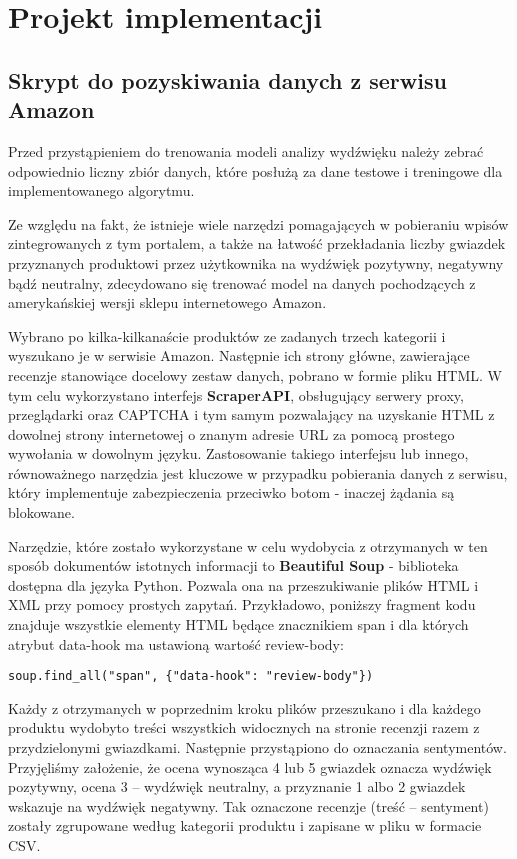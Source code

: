 \newpage
\section{Projekt implementacji}
\subsection{Skrypt do pozyskiwania danych z serwisu Amazon}
Przed przystąpieniem do trenowania modeli analizy wydźwięku należy zebrać odpowiednio liczny zbiór danych, które posłużą za dane testowe i treningowe dla implementowanego algorytmu.

Ze względu na fakt, że istnieje wiele narzędzi pomagających w pobieraniu wpisów zintegrowanych z tym portalem, a także na łatwość przekładania liczby gwiazdek przyznanych produktowi przez użytkownika na wydźwięk pozytywny, negatywny bądź neutralny, zdecydowano się trenować model na danych pochodzących z amerykańskiej wersji sklepu internetowego Amazon.

Wybrano po kilka-kilkanaście produktów ze zadanych trzech kategorii i wyszukano je w serwisie Amazon. Następnie ich strony główne, zawierające recenzje stanowiące docelowy zestaw danych, pobrano w formie pliku HTML. W tym celu wykorzystano interfejs \textbf{ScraperAPI}\cite{scraperapi}, obsługujący serwery proxy, przeglądarki oraz CAPTCHA i tym samym pozwalający na uzyskanie HTML z dowolnej strony internetowej o znanym adresie URL za pomocą prostego wywołania w dowolnym języku. Zastosowanie takiego interfejsu lub innego, równoważnego narzędzia jest kluczowe w przypadku pobierania danych z serwisu, który implementuje zabezpieczenia przeciwko botom - inaczej żądania są blokowane.

Narzędzie, które zostało wykorzystane w celu wydobycia z otrzymanych w ten sposób dokumentów istotnych informacji to \textbf{Beautiful Soup}\cite{bs4} - biblioteka dostępna dla języka Python. Pozwala ona na przeszukiwanie plików HTML i XML przy pomocy prostych zapytań. Przykładowo, poniższy fragment kodu znajduje wszystkie elementy HTML będące znacznikiem span i dla których atrybut data-hook ma ustawioną wartość review-body: %
\begin{lstlisting}
soup.find_all("span", {"data-hook": "review-body"})
\end{lstlisting}

Każdy z otrzymanych w poprzednim kroku plików przeszukano i dla każdego produktu wydobyto treści wszystkich widocznych na stronie recenzji razem z przydzielonymi gwiazdkami. Następnie przystąpiono do oznaczania sentymentów. Przyjęliśmy założenie, że ocena wynosząca 4 lub 5 gwiazdek oznacza wydźwięk pozytywny, ocena 3 -- wydźwięk neutralny, a przyznanie 1 albo 2 gwiazdek wskazuje na wydźwięk negatywny. Tak oznaczone recenzje (treść -- sentyment) zostały zgrupowane według kategorii produktu i zapisane w pliku w formacie CSV.

